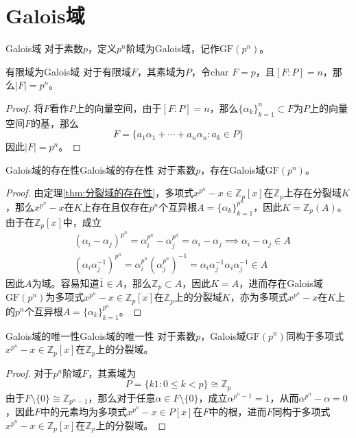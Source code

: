 \documentclass[lang = cn, scheme = chinese, thmcnt = section]{elegantbook}
\newcommand{\Z}{\mathbb{Z}}            %
\newcommand{\sub}{\subset}             %
\newcommand{\Char}{\text{char }}            %
\begin{document}
\section{Galois域}

\begin{definition}{Galois域}
	对于素数$p$，定义$p^n$阶域为Galois域，记作$\text{GF}(p^n)$。
\end{definition}

\begin{theorem}{有限域为Galois域}
	对于有限域$F$，其素域为$P$，令$\Char F=p$，且$[F:P]=n$，那么$|F|=p^n$。
\end{theorem}

\begin{proof}
	将$F$看作$P$上的向量空间，由于$[F:P]=n$，那么$\{\alpha_k\}_{k=1}^{n}\sub F$为$P$上的向量空间$F$的基，那么
	$$
	F=\{ a_1\alpha_1+\cdots+a_n\alpha_n:a_k\in P \}
	$$
	因此$|F|=p^n$。
\end{proof}

\begin{theorem}{Galois域的存在性}{Galois域的存在性}
	对于素数$p$，存在Galois域$\text{GF}(p^n)$。
\end{theorem}

\begin{proof}
	由定理\ref{thm:分裂域的存在性}，多项式$x^{p^n}-x\in \Z_p[x]$在$\Z_p$上存在分裂域$K$，那么$x^{p^n}-x$在$K$上存在且仅存在$p^n$个互异根$A=\{\alpha_k\}_{k=1}^{p^n}$，因此$K=\Z_p(A)$。由于在$\Z_p[x]$中，成立
	\begin{align*}
		&(\alpha_i-\alpha_j)^{p^n}=\alpha_i^{p^n}-\alpha_j^{p^n}=\alpha_i-\alpha_j\implies\alpha_i-\alpha_j\in A\\
		&(\alpha_i\alpha_j^{-1})^{p^n}=\alpha_i^{p^n}(\alpha_j^{p^n})^{-1}=\alpha_i\alpha_j^{-1}\alpha_i\alpha_j^{-1}\in A
	\end{align*}
	因此$A$为域。容易知道$\overline{1}\in A$，那么$\Z_p\sub A$，因此$K=A$，进而存在Galois域$\text{GF}(p^n)$为多项式$x^{p^n}-x\in \Z_p[x]$在$\Z_p$上的分裂域$K$，亦为多项式$x^{p^n}-x$在$K$上的$p^n$个互异根$A=\{\alpha_k\}_{k=1}^{p^n}$。
\end{proof}

\begin{theorem}{Galois域的唯一性}{Galois域的唯一性}
	对于素数$p$，Galois域$\text{GF}(p^n)$同构于多项式$x^{p^n}-x\in \Z_p[x]$在$\Z_p$上的分裂域。
\end{theorem}

\begin{proof}
	对于$p^n$阶域$F$，其素域为
	$$
	P=\{k1:0\le k<p\}\cong\Z_p
	$$
	由于$F\setminus\{0\}\cong \Z_{p^n-1}$，那么对于任意$\alpha\in F\setminus\{0\}$，成立$\alpha^{p^n-1}=1$，从而$\alpha^{p^n}-\alpha=0$，因此$F$中的元素均为多项式$x^{p^n}-x\in P[x]$在$F$中的根，进而$F$同构于多项式$x^{p^n}-x\in \Z_p[x]$在$\Z_p$上的分裂域。
\end{proof}
\end{document}
